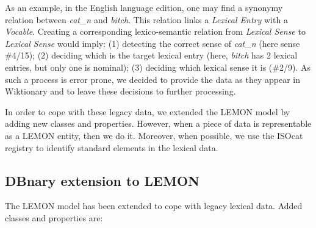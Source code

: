 \documentclass[sw]{iosart2c}
\begin{document}
As an example, in the English language edition, one may find a synonymy relation between \textit{cat\_n} and \textit{bitch}. This relation links a \textit{Lexical Entry} with a \textit{Vocable}. Creating a corresponding lexico-semantic relation from \textit{Lexical Sense} to \textit{Lexical Sense} would imply: (1) detecting the correct sense of \textit{cat\_n} (here sense \#4/15); (2) deciding which is the target lexical entry (here, \textit{bitch} has 2 lexical entries, but only one is nominal); (3) deciding which lexical sense it is (\#2/9). As such a process is error prone, we decided to provide the data as they appear in Wiktionary and to leave these decisions to further processing.

In order to cope with these legacy data, we extended the LEMON model by adding new classes and properties. However, when a piece of data is representable as a LEMON entity, then we do it. Moreover, when possible, we use the ISOcat registry \cite{DBLP:books/daglib/p/WindhouwerW12} to identify standard elements in the lexical data.

\subsection{DBnary extension to LEMON}

The LEMON model has been extended to cope with legacy lexical data. Added classes and properties are:
\end{document}
